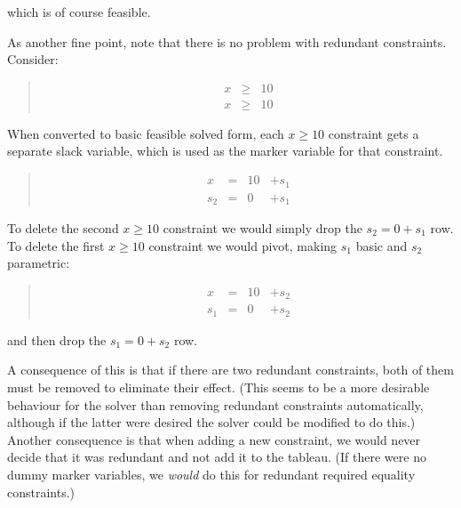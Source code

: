 \documentclass{article}
\begin{document}
which is of course feasible.

As another fine point, note that there is no problem with redundant
constraints.  Consider:

\begin{quote}\vspace*{-1ex}
$$
\begin{array}{rlrrr} 
x & \geq & 10   \\
x & \geq & 10 
\end{array}
$$
\end{quote}\vspace{-0.9ex}

When converted to basic feasible solved form, each $x \geq 10$ constraint
gets a separate slack variable, which is used as the marker variable for
that constraint.


\begin{quote}\vspace*{-1ex}
$$
\begin{array}{rlrrr} 
x & = & 10 & + s_1   \\ \hline
s_2 & = & 0 & + s_1 
\end{array}
$$
\end{quote}\vspace{-0.9ex}

To delete the second $x \geq 10$ constraint we would simply drop
the $s_2 = 0 + s_1$ row.  To delete the first  $x \geq 10$ constraint we
would pivot, making $s_1$ basic and $s_2$ parametric:

\begin{quote}\vspace*{-1ex}
$$
\begin{array}{rlrrr}
x & = & 10 & + s_2   \\ \hline
s_1 & = & 0 & + s_2
\end{array}
$$
\end{quote}\vspace{-0.9ex}

and then drop the  $s_1 = 0 + s_2$ row.

A consequence of this is that if there are two redundant constraints, both
of them must be removed to eliminate their effect.  (This seems to be a
more desirable behaviour for the solver than removing redundant constraints
automatically, although if the latter were desired the solver could be
modified to do this.)  Another consequence is that when adding a new
constraint, we would never decide that it was redundant and not add it to
the tableau.  (If there were no dummy marker variables, we \emph{would} do this
for redundant required equality constraints.)
\end{document}
